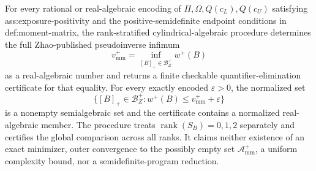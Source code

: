 For every rational or real-algebraic encoding of \(\Pi,\Omega,Q(c_L),Q(c_U)\) satisfying ass:exposure-positivity and the positive-semidefinite endpoint conditions in def:moment-matrix, the rank-stratified cylindrical-algebraic procedure determines the full Zhao-published pseudoinverse infimum
\[
v_{\mathrm{mm}}^+=\inf_{[B]_+\in\mathcal B_Z^+}w^+(B)
\]
as a real-algebraic number and returns a finite checkable quantifier-elimination certificate for that equality.  For every exactly encoded \(\varepsilon>0\), the normalized set
\[
\{[B]_+\in\mathcal B_Z^+:w^+(B)\le v_{\mathrm{mm}}^++\varepsilon\}
\]
is a nonempty semialgebraic set and the certificate contains a normalized real-algebraic member.  The procedure treats \(\operatorname{rank}(S_B)=0,1,2\) separately and certifies the global comparison across all ranks.  It claims neither existence of an exact minimizer, outer convergence to the possibly empty set \(\mathcal A_{\mathrm{mm}}^+\), a uniform complexity bound, nor a semidefinite-program reduction.